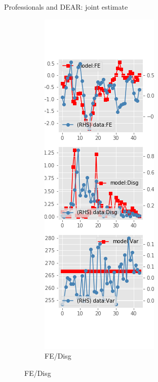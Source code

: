 \documentclass{beamer}
\begin{document}
\begin{frame}{Professionals and DEAR: joint estimate}
\begin{figure}[ht]
\begin{subfigure}[b]{0.2\textwidth}
		\end{subfigure}
		\hfill
		\begin{subfigure}[b]{0.2\textwidth}
			\caption{FE/Disg}
			\includegraphics[width=\textwidth, height = 0.8\textheight]{figuresDraft/spf_de_est_joint_diag2.png}
		\end{subfigure}
	\end{figure}
\end{frame}
\end{document}
